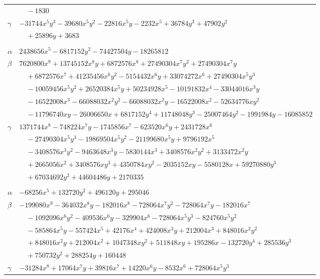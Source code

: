 \documentclass[11pt]{article}
\begin{document}
\begin{longtable}{@{}ll@{}}
 & $\quad -1830$\\
$\gamma$ & $-31744x^{5}y^{3}-39680x^{5}y^{2}-22816x^{5}y-2232x^{5}+36784y^{3}+47902y^{2}$\\
 & $\quad +25896y+3683$\\
\addlinespace[3pt]
\multicolumn{2}{@{}l}{$\{i,j\}=\{7,33\}$, $k_{ij}=5^{3}\cdot 7\cdot 11$}\\
$\alpha$ & $2438656x^{5}-6817152y^{2}-74427504y-18265812$\\
$\beta$ & $7620800x^{9}+13745152x^{8}y+6872576x^{8}+27490304x^{7}y^{2}+27490304x^{7}y$\\
 & $\quad +6872576x^{7}+41235456x^{6}y^{2}-5154432x^{6}y+33074272x^{6}+27490304x^{5}y^{3}$\\
 & $\quad -10059456x^{5}y^{2}+26520384x^{5}y+50234928x^{5}-10191832x^{4}-33044016x^{3}y$\\
 & $\quad -16522008x^{3}-66088032x^{2}y^{2}-66088032x^{2}y-16522008x^{2}-52634776xy^{2}$\\
 & $\quad -11796740xy-26006650x+6817152y^{4}+11748048y^{3}-25007464y^{2}-1991984y-16085852$\\
$\gamma$ & $1371744x^{8}-748224x^{7}y-1745856x^{7}-623520x^{6}y+2431728x^{6}$\\
 & $\quad -27490304x^{5}y^{3}-19869504x^{5}y^{2}-21199680x^{5}y+9796192x^{5}$\\
 & $\quad -3408576x^{3}y^{2}-9463648x^{3}y-5830144x^{3}+3408576x^{2}y^{2}+3133472x^{2}y$\\
 & $\quad +2665056x^{2}+3408576xy^{3}+4350784xy^{2}-2035152xy-5580128x+59270880y^{3}$\\
 & $\quad +67034692y^{2}+44604486y+2170335$\\
\addlinespace[3pt]
\multicolumn{2}{@{}l}{$\{i,j\}=\{7,35\}$, $k_{ij}=2^{3}\cdot 7^{2}$}\\
$\alpha$ & $-68256x^{5}+132720y^{2}+496120y+295046$\\
$\beta$ & $-199080x^{9}-364032x^{8}y-182016x^{8}-728064x^{7}y^{2}-728064x^{7}y-182016x^{7}$\\
 & $\quad -1092096x^{6}y^{2}-409536x^{6}y-329904x^{6}-728064x^{5}y^{3}-824760x^{5}y^{2}$\\
 & $\quad -585864x^{5}y-557424x^{5}+42176x^{4}+424008x^{3}y+212004x^{3}+848016x^{2}y^{2}$\\
 & $\quad +848016x^{2}y+212004x^{2}+1047348xy^{2}+511848xy+195286x-132720y^{4}+285536y^{3}$\\
 & $\quad +750732y^{2}+288254y+160448$\\
$\gamma$ & $-31284x^{8}+17064x^{7}y+39816x^{7}+14220x^{6}y-8532x^{6}+728064x^{5}y^{3}$\\

\end{longtable}
\end{document}
